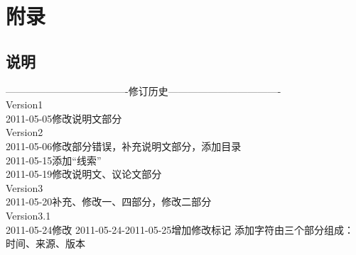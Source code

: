 \appendix
{}
\section{附录}
\subsection{说明}
-------------------------------------修订历史----------------------------------\\
Version1\\
2011-05-05修改说明文部分\\%
Version2\\
2011-05-06修改部分错误，补充说明文部分，添加目录\\%
2011-05-15添加“线索”\\%
2011-05-19修改说明文、议论文部分\\%
Version3\\
2011-05-20补充、修改一、四部分，修改二部分\\%
Version3.1\\
2011-05-24修改%
2011-05-24-2011-05-25增加修改标记%
添加字符由三个部分组成：\\
时间、来源、版本\\
